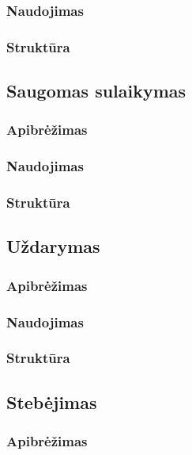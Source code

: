 \documentclass[10pt]{IEEEtran}
\begin{document}
			\subsubsection{Naudojimas}

			\subsubsection{Struktūra}
		
		\subsection{Saugomas sulaikymas}

			\subsubsection{Apibrėžimas}

			\subsubsection{Naudojimas}

			\subsubsection{Struktūra}

		\subsection{Uždarymas}

			\subsubsection{Apibrėžimas}

			\subsubsection{Naudojimas}

			\subsubsection{Struktūra}

		\subsection{Stebėjimas}

			\subsubsection{Apibrėžimas}
\end{document}
